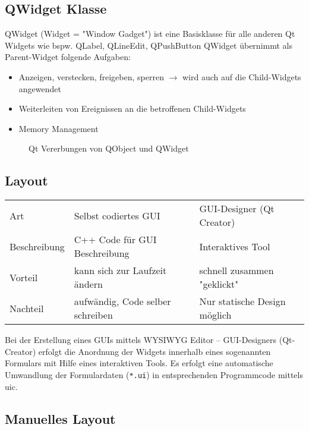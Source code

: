 \subsection{QWidget Klasse}
QWidget (Widget = "Window Gadget") ist eine Basisklasse für alle anderen Qt Widgets wie bspw. QLabel, QLineEdit, QPushButton
QWidget übernimmt als Parent-Widget folgende Aufgaben:
\begin{itemize}
    \item Anzeigen, verstecken, freigeben, sperren \(\rightarrow\) wird auch auf die Child-Widgets angewendet 
    \item Weiterleiten von Ereignissen an die betroffenen Child-Widgets
    \item Memory Management 
\end{itemize}

\begin{figure}[hb] \centering
    \caption[]{Qt Vererbungen von QObject und QWidget}
\end{figure}

\subsection{Layout}

\begin{table}[h] \centering
\begin{tabular}{lll}
    \toprule
    Art          & Selbst codiertes GUI             & GUI-Designer (Qt Creator)    \\
    Beschreibung & C++ Code für GUI Beschreibung    & Interaktives Tool            \\
    Vorteil      & kann sich zur Laufzeit ändern    & schnell zusammen "geklickt"  \\
    Nachteil     & aufwändig, Code selber schreiben & Nur statische Design möglich \\
    \bottomrule
\end{tabular}
\end{table}

Bei der Erstellung eines GUIs mittels WYSIWYG Editor – GUI-Designers (Qt-Creator) erfolgt die Anordnung der Widgets innerhalb eines sogenannten Formulars mit Hilfe eines interaktiven Tools. Es erfolgt eine automatische Umwandlung der Formulardaten (\texttt{*.ui}) in entsprechenden Programmcode mittels uic.

\subsection{Manuelles Layout}

